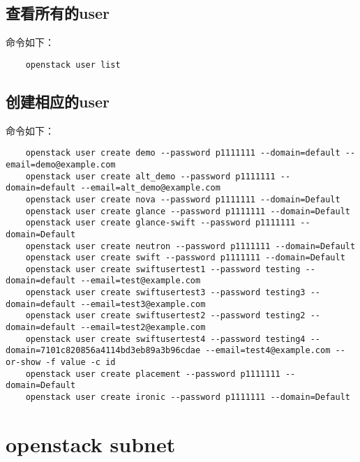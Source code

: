 \documentclass[a4paper,left=1.5cm,right=1.5cm,11pt]{article}
\begin{document}
\subsection{查看所有的user}
	命令如下：
	\begin{lstlisting}
	openstack user list
	\end{lstlisting}

\subsection{创建相应的user}
	命令如下：
	\begin{lstlisting}
	openstack user create demo --password p1111111 --domain=default --email=demo@example.com
	openstack user create alt_demo --password p1111111 --domain=default --email=alt_demo@example.com
	openstack user create nova --password p1111111 --domain=Default
	openstack user create glance --password p1111111 --domain=Default
	openstack user create glance-swift --password p1111111 --domain=Default
	openstack user create neutron --password p1111111 --domain=Default
	openstack user create swift --password p1111111 --domain=Default
	openstack user create swiftusertest1 --password testing --domain=default --email=test@example.com
	openstack user create swiftusertest3 --password testing3 --domain=default --email=test3@example.com
	openstack user create swiftusertest2 --password testing2 --domain=default --email=test2@example.com
	openstack user create swiftusertest4 --password testing4 --domain=7101c820856a4114bd3eb89a3b96cdae --email=test4@example.com --or-show -f value -c id
	openstack user create placement --password p1111111 --domain=Default
	openstack user create ironic --password p1111111 --domain=Default
	\end{lstlisting}

\section{openstack subnet}
\end{document}

